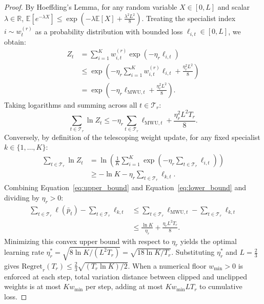 \documentclass[10pt,a4paper,twocolumn]{article}
\begin{document}
\begin{proof}
By Hoeffding's Lemma, for any random variable $X \in [0, L]$ and scalar $\lambda \in \mathbb{R}$, $\mathbb{E}[e^{-\lambda X}] \le \exp(-\lambda \mathbb{E}[X] + \frac{\lambda^2 L^2}{8})$. Treating the specialist index $i \sim w_t^{(r)}$ as a probability distribution with bounded loss $\ell_{i,t} \in [0, L]$, we obtain:
\begin{align}
  Z_t &= \sum_{i=1}^K w_{i,t}^{(r)} \exp(-\eta_r \ell_{i,t}) \nonumber \\
  &\le \exp\!\left( -\eta_r \sum_{i=1}^K w_{i,t}^{(r)} \ell_{i,t} + \frac{\eta_r^2 L^2}{8} \right) \nonumber \\
  &= \exp\!\left(-\eta_r \ell_{\text{MWU},t} + \frac{\eta_r^2 L^2}{8}\right).
\end{align}
Taking logarithms and summing across all $t \in \mathcal{T}_r$:
\begin{equation}
  \sum_{t \in \mathcal{T}_r} \ln Z_t \le -\eta_r \sum_{t \in \mathcal{T}_r} \ell_{\text{MWU},t} + \frac{\eta_r^2 L^2 T_r}{8}.
  \label{eq:upper_bound}
\end{equation}
Conversely, by definition of the telescoping weight update, for any fixed specialist $k \in \{1, \dots, K\}$:
\begin{align}
  \sum_{t \in \mathcal{T}_r} \ln Z_t &= \ln \left( \frac{1}{K} \sum_{i=1}^K \exp\!\left( -\eta_r \sum_{t \in \mathcal{T}_r} \ell_{i,t} \right) \right) \nonumber \\
  &\ge -\ln K - \eta_r \sum_{t \in \mathcal{T}_r} \ell_{k,t}.
  \label{eq:lower_bound}
\end{align}
Combining Equation~\eqref{eq:upper_bound} and Equation~\eqref{eq:lower_bound} and dividing by $\eta_r > 0$:
\begin{align}
  \sum_{t \in \mathcal{T}_r} \ell(\bar{p}_t) - \sum_{t \in \mathcal{T}_r} \ell_{k,t} &\le \sum_{t \in \mathcal{T}_r} \ell_{\text{MWU},t} - \sum_{t \in \mathcal{T}_r} \ell_{k,t} \nonumber \\
  &\le \frac{\ln K}{\eta_r} + \frac{\eta_r L^2 T_r}{8}.
\end{align}
Minimizing this convex upper bound with respect to $\eta_r$ yields the optimal learning rate $\eta_r^* = \sqrt{8 \ln K / (L^2 T_r)} = \sqrt{18 \ln K / T_r}$. Substituting $\eta_r^*$ and $L = \frac{2}{3}$ gives $\text{Regret}_r(T_r) \le \frac{2}{3}\sqrt{(T_r \ln K)/2}$. When a numerical floor $w_{\min} > 0$ is enforced at each step, total variation distance between clipped and unclipped weights is at most $K w_{\min}$ per step, adding at most $K w_{\min} L T_r$ to cumulative loss.
\end{proof}
\end{document}
